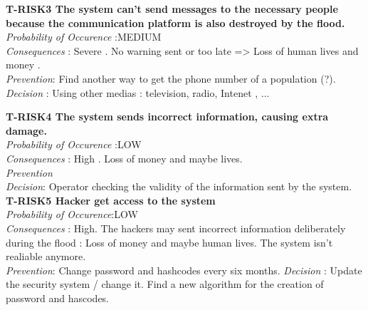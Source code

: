 	
	\textbf{ T-RISK3 The system can't send messages to the necessary people because the communication platform is also destroyed by the flood.} \\
	\textit{Probability of Occurence} :MEDIUM\\
	\textit{Consequences} : Severe . No warning sent or too late => Loss of human lives and money .\\
	\textit{Prevention}: Find another way to get the phone number of a population (?). \\
	\textit{Decision} : Using other medias : television, radio, Intenet , ...
	
	\textbf{ T-RISK4 The system sends incorrect information, causing extra damage.} \\
	\textit{Probability of Occurence} :LOW\\
	\textit{Consequences} : High . Loss of money and maybe lives.\\
	\textit{Prevention} \\
	\textit{Decision}: Operator checking the validity of the information sent by the system. \\
	
	\textbf{ T-RISK5 Hacker get access to the system} \\
	\textit{Probability of Occurence}:LOW \\
	\textit{Consequences} : High. The hackers may sent incorrect information deliberately during the flood : Loss of money and maybe human lives. The system isn't realiable anymore. \\
	\textit{Prevention}: Change password and hashcodes every six months.
	\textit{Decision} : Update the security system / change it. Find a new algorithm for the creation of password and hascodes. \\
